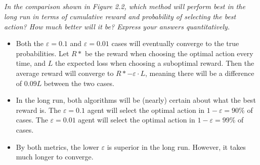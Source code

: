 \documentclass{article}
\begin{document}
\subsection{}
\textit{In the comparison shown in Figure 2.2, which method will perform best in the long run in terms of cumulative reward and probability of selecting the best action? How much better will it be? Express your answers quantitatively.}
\begin{itemize}
\item Both the $\varepsilon = 0.1$ and $\varepsilon = 0.01$ cases will eventually converge to the true probabilities. Let $R*$ be the reward when choosing the optimal action every time, and $L$ the expected loss when choosing a suboptimal reward. Then the average reward will converge to $R* - \varepsilon \cdot L$, meaning there will be a difference of $0.09 L$ between the two cases.
\item In the long run, both algorithms will be (nearly) certain about what the best reward is. The $\varepsilon = 0.1$ agent will select the optimal action in $1 - \varepsilon = 90\%$ of cases. The $\varepsilon = 0.01$ agent will select the optimal action in $1 - \varepsilon = 99\%$ of cases. 
\item By both metrics, the lower $\varepsilon$ is superior in the long run. However, it takes much longer to converge.
\end{itemize}
\end{document}
